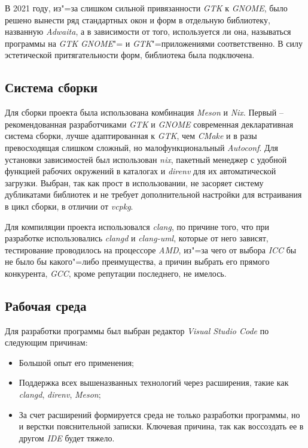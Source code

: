В 2021 году, из"=за слишком сильной привязанности \textit{GTK} к \textit{GNOME},
было решено вынести ряд стандартных окон и форм в отдельную библиотеку,
названную \textit{Adwaita}, а в зависимости от того, используется ли она,
называться программы на \textit{GTK} \textit{GNOME}"= и
\textit{GTK}"=приложениями соответственно. В силу эстетической притягательности
форм, библиотека была подключена.

\subsection{Система сборки}

Для сборки проекта была использована комбинация \textit{Meson} и \textit{Nix}.
Первый -- рекомендованная разработчиками \textit{GTK} и \textit{GNOME}
современная декларативная система сборки, лучше адаптированная к \textit{GTK},
чем \textit{CMake} и в разы превосходящая слишком сложный, но малофункциональный
\textit{Autoconf}. Для установки зависимостей был использован \textit{nix},
пакетный менеджер с удобной функцией рабочих окружений в каталогах и
\textit{direnv} для их автоматической загрузки. Выбран, так как прост в
использовании, не засоряет систему дубликатами библиотек и не требует
дополнительной настройки для встраивания в цикл сборки, в отличии от
\textit{vcpkg}.

Для компиляции проекта использовался \textit{clang}, по причине того, что при
разработке использовались \textit{clangd} и \textit{clang-uml}, которые от него
зависят, тестирование проводилось на процессоре \textit{AMD}, из"=за чего от
выбора \textit{ICC} бы не было бы какого"=либо преимущества, а причин выбрать
его прямого конкурента, \textit{GCC}, кроме репутации последнего, не имелось.

\subsection{Рабочая среда}

Для разработки программы был выбран редактор \textit{Visual Studio Code} по
следующим причинам:

\begin{itemize}
      \item Большой опыт его применения;
      \item Поддержка всех вышеназванных технологий через расширения, такие как
            \textit{clangd}, \textit{direnv}, \textit{Meson};
      \item За счет расширений формируется среда не только разработки программы,
            но и верстки пояснительной записки. Ключевая причина, так как
            воссоздать ее в другом \textit{IDE} будет тяжело.
\end{itemize}

